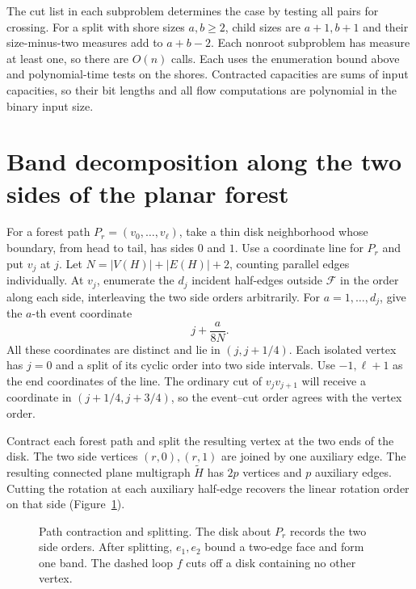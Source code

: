 \documentclass[10pt,letterpaper]{article}
\newcommand{\forest}{\mathcal F}
\begin{document}
The cut list in each subproblem determines the case by testing all pairs for crossing. For a split with shore sizes \(a,b\ge2\), child sizes are \(a+1,b+1\) and their size-minus-two measures add to \(a+b-2\). Each nonroot subproblem has measure at least one, so there are \(O(n)\) calls. Each uses the enumeration bound above and polynomial-time tests on the shores. Contracted capacities are sums of input capacities, so their bit lengths and all flow computations are polynomial in the binary input size.

\section{Band decomposition along the two sides of the planar forest}
For a forest path \(P_r=(v_0,\ldots,v_\ell)\), take a thin disk neighborhood whose boundary, from head to tail, has sides \(0\) and \(1\). Use a coordinate line for \(P_r\) and put \(v_j\) at \(j\). Let \(N=|V(H)|+|E(H)|+2\), counting parallel edges individually. At \(v_j\), enumerate the \(d_j\) incident half-edges outside \(\forest\) in the order along each side, interleaving the two side orders arbitrarily. For \(a=1,\ldots,d_j\), give the \(a\)-th event coordinate
\[
             j+\frac{a}{8N}.
\]
All these coordinates are distinct and lie in \((j,j+1/4)\). Each isolated vertex has \(j=0\) and a split of its cyclic order into two side intervals. Use \(-1,\ell+1\) as the end coordinates of the line. The ordinary cut of \(v_jv_{j+1}\) will receive a coordinate in \((j+1/4,j+3/4)\), so the event--cut order agrees with the vertex order.

Contract each forest path and split the resulting vertex at the two ends of the disk. The two side vertices \((r,0),(r,1)\) are joined by one auxiliary edge. The resulting connected plane multigraph \(\widetilde H\) has \(2p\) vertices and \(p\) auxiliary edges. Cutting the rotation at each auxiliary half-edge recovers the linear rotation order on that side (Figure~\ref{fig:split}).

\begin{figure}[H]
\centering

\caption{Path contraction and splitting. The disk about \(P_r\) records the two side orders. After splitting, \(e_1,e_2\) bound a two-edge face and form one band. The dashed loop \(f\) cuts off a disk containing no other vertex.}
\label{fig:split}
\end{figure}
\end{document}

